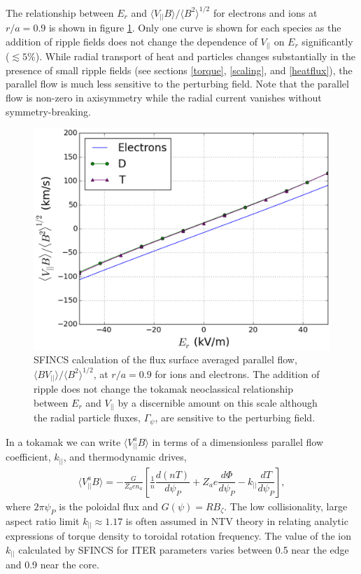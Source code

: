 \documentclass[aip, pop, preprint]{revtex4-1}
\numberwithin{figure}{section}
\numberwithin{equation}{section}
\newcommand{\der}[2]{\dfrac{d #1}{d  #2}}
\begin{document}
The relationship between $E_r$ and $\langle V_{||} B \rangle/\langle B^2 \rangle^{1/2}$ for electrons and ions at $r/a = 0.9$ is shown in figure \ref{fig:Er_flow}. Only one curve is shown for each species as the addition of ripple fields does not change the dependence of $V_{||}$ on $E_r$ significantly ($\lesssim 5 \%$). While radial transport of heat and particles changes substantially in the presence of small ripple fields (see sections \ref{torque}, \ref{scaling}, and \ref{heatflux}), the parallel flow is much less sensitive to the perturbing field. Note that the parallel flow is non-zero in axisymmetry while the radial current vanishes without symmetry-breaking. 

\begin{figure}[h!]
\centering
\includegraphics[width=.7\textwidth]{figure5.eps}
\caption{\label{fig:Er_flow} SFINCS calculation of the flux surface averaged parallel flow, $\langle B V_{||} \rangle/\langle B^2 \rangle^{1/2}$, at $r/a = 0.9$ for ions and electrons. The addition of ripple does not change the tokamak neoclassical relationship between $E_r$ and $V_{||}$ by a discernible amount on this scale although the radial particle fluxes, $\Gamma_{\psi}$, are sensitive to the perturbing field.}
\end{figure}

In a tokamak we can write $\langle V_{||}^a B \rangle$ in terms of a dimensionless parallel flow coefficient, $k_{||}$, and thermodynamic drives,
\begin{gather}
\langle  V_{||}^a  B\rangle = -\frac{G}{Z_a e n_a} \left[ \frac{1}{n} \der{(nT)}{\psi_P} + Z_a e \der{\Phi}{\psi_P} - k_{||} \der{T}{\psi_P} \right],
\end{gather}
where $2 \pi \psi_P$ is the poloidal flux and $G(\psi) = R B_{\zeta}$. The low collisionality, large aspect ratio limit \cite{Hinton1976, Hirshman1981} $k_{||} \approx 1.17$ is often assumed in NTV theory \cite{Callen2011, Sun2011} in relating analytic expressions of torque density to toroidal rotation frequency. The value of the ion $k_{||}$ calculated by SFINCS for ITER parameters varies between 0.5 near the edge and 0.9 near the core. 
\end{document}
